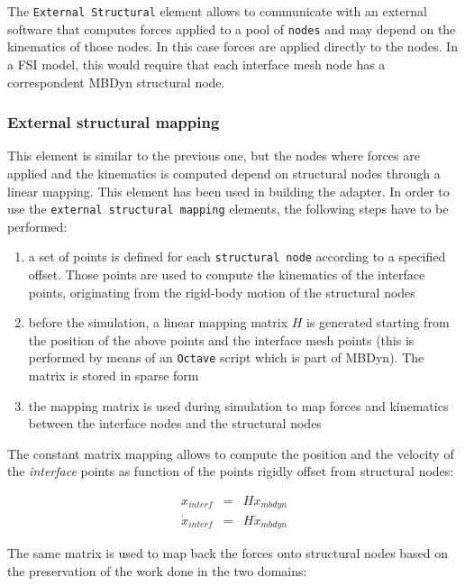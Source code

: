 The \texttt{External Structural} element allows to communicate with an external software that computes forces applied to a pool of \texttt{nodes} and may depend on the kinematics of those nodes. In this case forces are applied directly to the nodes. In a FSI model, this would require that each interface mesh node has a correspondent MBDyn structural node. 

\subsubsection{External structural mapping}


This element is similar to the previous one, but the nodes where forces are applied and the kinematics is computed depend on structural nodes through a linear mapping. This element has been used in building the adapter. In order to use the \texttt{external structural mapping} elements, the following steps have to be performed:

\begin{enumerate}
	\item a set of points is defined for each \texttt{structural node} according to a specified offset. Those points are used to compute the kinematics of the interface points, originating from the rigid-body motion of the structural nodes
	\item before the simulation, a linear mapping matrix $H$ is generated starting from the position of the above points and the interface mesh points (this is performed by means of an \texttt{Octave} script which is part of MBDyn). The matrix is stored in sparse form
	\item the mapping matrix is used during simulation to map forces and kinematics between the interface nodes and the structural nodes
\end{enumerate}

The constant matrix mapping allows to compute the position and the velocity of the \textit{interface} points as function of the points rigidly offset from structural nodes:

\begin{subequations}
	\begin{eqnarray}
		x_{interf} &=& H x_{mbdyn} \\
		\dot{x}_{interf} &=& H \dot{x}_{mbdyn} 
	\end{eqnarray}
\end{subequations}

The same matrix is used to map back the forces onto structural nodes based on the preservation of the work done in the two domains:


